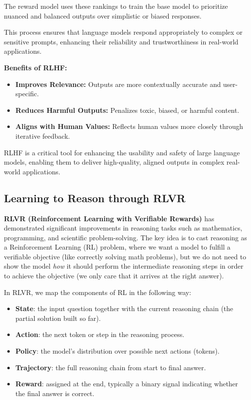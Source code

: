 The reward model uses these rankings to train the base model to prioritize nuanced and balanced outputs over simplistic or biased responses.

This process ensures that language models respond appropriately to complex or sensitive prompts, enhancing their reliability and trustworthiness in real-world applications. 

\textbf{Benefits of RLHF:}
\begin{itemize}
    \item \textbf{Improves Relevance:} Outputs are more contextually accurate and user-specific.
    \item \textbf{Reduces Harmful Outputs:} Penalizes toxic, biased, or harmful content.
    \item \textbf{Aligns with Human Values:} Reflects human values more closely through iterative feedback.
\end{itemize}

RLHF is a critical tool for enhancing the usability and safety of large language models, enabling them to deliver high-quality, aligned outputs in complex real-world applications.

\subsection{Learning to Reason through RLVR}

\textbf{RLVR (Reinforcement Learning with Verifiable Rewards)} has demonstrated significant improvements in reasoning tasks such as mathematics, programming, and scientific problem-solving. The key idea is to cast reasoning as a Reinforcement Learning (RL) problem, where we want a model to fulfill a verifiable objective (like correctly solving math problems), but we do not need to show the model \textit{how} it should perform the intermediate reasoning steps in order to achieve the objective (we only care that it arrives at the right answer).

In RLVR, we map the components of RL in the following way:
\begin{itemize}
    \item \textbf{State}: the input question together with the current reasoning chain (the partial solution built so far).  
    \item \textbf{Action}: the next token or step in the reasoning process.  
    \item \textbf{Policy}: the model’s distribution over possible next actions (tokens).  
    \item \textbf{Trajectory}: the full reasoning chain from start to final answer.  
    \item \textbf{Reward}: assigned at the end, typically a binary signal indicating whether the final answer is correct.  
\end{itemize}

